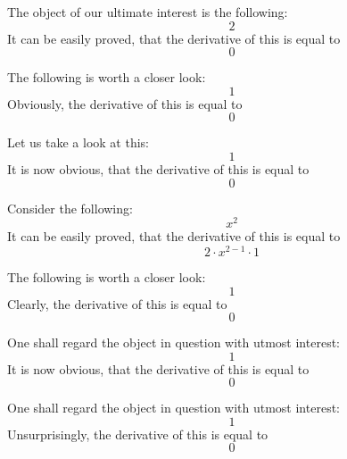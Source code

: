 \documentclass{article}
\begin{document}
The object of our ultimate interest is the following:
\begin{equation}
2 
\end{equation}
It can be easily proved, that the derivative of this is equal to
\begin{equation}
0 
\end{equation}

The following is worth a closer look:
\begin{equation}
1 
\end{equation}
Obviously, the derivative of this is equal to
\begin{equation}
0 
\end{equation}

Let us take a look at this:
\begin{equation}
1 
\end{equation}
It is now obvious, that the derivative of this is equal to
\begin{equation}
0 
\end{equation}

Consider the following:
\begin{equation}
x ^{2 } 
\end{equation}
It can be easily proved, that the derivative of this is equal to
\begin{equation}
2 \cdot x ^{2 - 1 } \cdot 1 
\end{equation}

The following is worth a closer look:
\begin{equation}
1 
\end{equation}
Clearly, the derivative of this is equal to
\begin{equation}
0 
\end{equation}

One shall regard the object in question with utmost interest:
\begin{equation}
1 
\end{equation}
It is now obvious, that the derivative of this is equal to
\begin{equation}
0 
\end{equation}

One shall regard the object in question with utmost interest:
\begin{equation}
1 
\end{equation}
Unsurprisingly, the derivative of this is equal to
\begin{equation}
0 
\end{equation}
\end{document}
